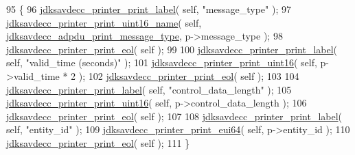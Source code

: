 \begin{DoxyCode}
95 \{
96     \hyperlink{group__util_gaf7818b24143b3c7502926a425a242ff5}{jdksavdecc\_printer\_print\_label}( \textcolor{keyword}{self}, \textcolor{stringliteral}{"message\_type"} );
97     \hyperlink{group__util_ga62486d864a66773d19bbbe23cebf346a}{jdksavdecc\_printer\_print\_uint16\_name}( \textcolor{keyword}{self}, 
      \hyperlink{group__adp__print_gad844d4559639ba7c2ff0faa49d972d20}{jdksavdecc\_adpdu\_print\_message\_type}, p->message\_type );
98     \hyperlink{group__util_gacda56c9d3d24593a52c999682fa6e6e3}{jdksavdecc\_printer\_print\_eol}( \textcolor{keyword}{self} );
99 
100     \hyperlink{group__util_gaf7818b24143b3c7502926a425a242ff5}{jdksavdecc\_printer\_print\_label}( \textcolor{keyword}{self}, \textcolor{stringliteral}{"valid\_time (seconds)"} );
101     \hyperlink{group__util_ga9793e0ff8e7ed25d957282ee6b257ce2}{jdksavdecc\_printer\_print\_uint16}( \textcolor{keyword}{self}, p->valid\_time * 2 );
102     \hyperlink{group__util_gacda56c9d3d24593a52c999682fa6e6e3}{jdksavdecc\_printer\_print\_eol}( \textcolor{keyword}{self} );
103 
104     \hyperlink{group__util_gaf7818b24143b3c7502926a425a242ff5}{jdksavdecc\_printer\_print\_label}( \textcolor{keyword}{self}, \textcolor{stringliteral}{"control\_data\_length"} );
105     \hyperlink{group__util_ga9793e0ff8e7ed25d957282ee6b257ce2}{jdksavdecc\_printer\_print\_uint16}( \textcolor{keyword}{self}, p->control\_data\_length );
106     \hyperlink{group__util_gacda56c9d3d24593a52c999682fa6e6e3}{jdksavdecc\_printer\_print\_eol}( \textcolor{keyword}{self} );
107 
108     \hyperlink{group__util_gaf7818b24143b3c7502926a425a242ff5}{jdksavdecc\_printer\_print\_label}( \textcolor{keyword}{self}, \textcolor{stringliteral}{"entity\_id"} );
109     \hyperlink{group__util_gafdf65e002e889f4fc89db5d1e532eaa3}{jdksavdecc\_printer\_print\_eui64}( \textcolor{keyword}{self}, p->entity\_id );
110     \hyperlink{group__util_gacda56c9d3d24593a52c999682fa6e6e3}{jdksavdecc\_printer\_print\_eol}( \textcolor{keyword}{self} );
111 \}
\end{DoxyCode}


